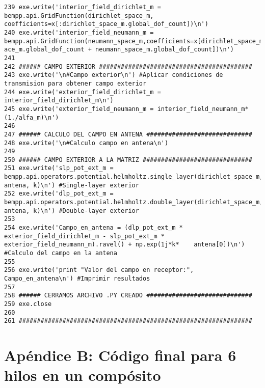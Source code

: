\documentclass[12pt,letterpaper]{report}
\numberwithin{equation}{section}
\begin{document}
\begin{lstlisting}
239 exe.write('interior_field_dirichlet_m = bempp.api.GridFunction(dirichlet_space_m, coefficients=x[:dirichlet_space_m.global_dof_count])\n')
240 exe.write('interior_field_neumann_m = bempp.api.GridFunction(neumann_space_m,coefficients=x[dirichlet_space_m.global_dof_count:dirichlet_sp    ace_m.global_dof_count + neumann_space_m.global_dof_count])\n')
241 
242 ###### CAMPO EXTERIOR ##########################################
243 exe.write('\n#Campo exterior\n') #Aplicar condiciones de transmision para obtener campo exterior 
244 exe.write('exterior_field_dirichlet_m = interior_field_dirichlet_m\n')
245 exe.write('exterior_field_neumann_m = interior_field_neumann_m*(1./alfa_m)\n')
246 
247 ###### CALCULO DEL CAMPO EN ANTENA #############################
248 exe.write('\n#Calculo campo en antena\n')
249 
250 ###### CAMPO EXTERIOR A LA MATRIZ ##############################
251 exe.write('slp_pot_ext_m = bempp.api.operators.potential.helmholtz.single_layer(dirichlet_space_m, antena, k)\n') #Single-layer exterior
252 exe.write('dlp_pot_ext_m = bempp.api.operators.potential.helmholtz.double_layer(dirichlet_space_m, antena, k)\n') #Double-layer exterior
253 
254 exe.write('Campo_en_antena = (dlp_pot_ext_m * exterior_field_dirichlet_m - slp_pot_ext_m * exterior_field_neumann_m).ravel() + np.exp(1j*k*    antena[0])\n') #Calculo del campo en la antena
255 
256 exe.write('print "Valor del campo en receptor:", Campo_en_antena\n') #Imprimir resultados
257 
258 ###### CERRAMOS ARCHIVO .PY CREADO #############################
259 exe.close
260 
261 ################################################################

\end{lstlisting}

\pagebreak

\part*{Apéndice B: Código final para 6 hilos en un compósito}
\end{document}
